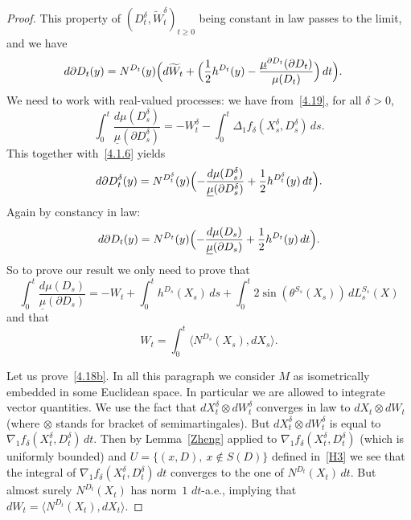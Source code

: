 \documentclass[JEP,XML,SOM,Unicode,NoFloatCountersInSection,published]{cedram}
\theoremstyle{plain}
\theoremstyle{definition}
\newcommand{\usm}{{\underline{\smash{\mu}}}}
\let\f\frac
\let\d\delta
\let\n\nabla
\let\wi\widetilde
\begin{document}
\begin{proof}
This property of $(D_t^\d, \wi W_t^\d)_{t\ge 0}$ being constant in law passes to the limit, and we have
\begin{equation}%
\begin{split}
d\partial D_t(y)&= N^{D_t}(y)\Bigl( d\wi{W}_t
+\Bigl( \f12 h^{D_t}(y) - \f{\usm^{\partial D_t}(\partial D_t)}{\mu(D_t)} \Bigr) \,dt \Bigr).
\end{split}
\end{equation}
We need to work with real-valued processes:
we have from~\eqref{4.19}, for all $\d>0$,
\begin{equation}
\label{4.17a}
\int_0^t\f{d\mu(D_s^\d)}{\underline{\mu}(\partial D_s^\d)}=-W_t^\d-\int_0^t\Delta_1f_\d (X_s^\d, D_s^\d)\, ds.
\end{equation}
This together with~\eqref{4.1.6} yields
\begin{equation}\label{4.1.9}
d\partial D^\d_t(y)= N^{D_t^\d}(y)\Bigl( -\f{d\mu(D_s^\d)}{\underline{\mu}(\partial D_s^\d)}
+ \f12 h^{D^\d_t}(y) \,dt \Bigr).
\end{equation}
Again by constancy in law:
\begin{equation}%
d\partial D_t(y)= N^{D_t}(y)\Bigl( -\f{d\mu(D_s)}{\underline{\mu}(\partial D_s)}
+ \f12 h^{D_t}(y) \,dt \Bigr).
\end{equation}
So to prove our result we only need to prove that
\begin{equation}
\label{4.18a}
\int_0^t\f{d\mu(D_s)}{\underline{\mu}(\partial D_s)}=-W_t+\int_0^t h^{D_s} (X_s)\, ds+\int_0^t2\sin\left(\theta^{S_s}(X_s)\right)\,dL_s^{S_s}(X)
\end{equation}
and that
\begin{equation}
\label{4.18b}
W_t=\int_0^t\langle N^{D_s}(X_s), dX_s\rangle.
\end{equation}

Let us prove~\eqref{4.18b}. In all this paragraph we consider $M$ as isometrically embedded in some Euclidean space. In particular we are allowed to integrate vector quantities. We use the fact that $dX_t^\d\otimes dW_t^\d$ converges in law to $dX_t\otimes dW_t$ (where $\otimes$ stands for bracket of semimartingales). But $dX_t^\d\otimes dW_t^\d$ is equal to $\n_1 f_\d(X_t^\d,D_t^\d)\, dt$.
Then by Lemma~\ref{Zheng} applied to $\n_1 f_\d(X_t^\d,D_t^\d)$ (which is uniformly bounded) and $U=\{(x,D), \ x\notin S(D)\}$ defined in~\eqref{H3} we see that the integral of $\n_1 f_\d(X_t^\d,D_t^\d)\, dt$ converges to the one of $N^{D_t}(X_t)\, dt$. But almost surely $N^{D_t}(X_t)$ has norm~$1$ $dt$-a.e., implying that $dW_t=\langle N^{D_t}(X_t), dX_t\rangle$.


\end{proof}
\end{document}
